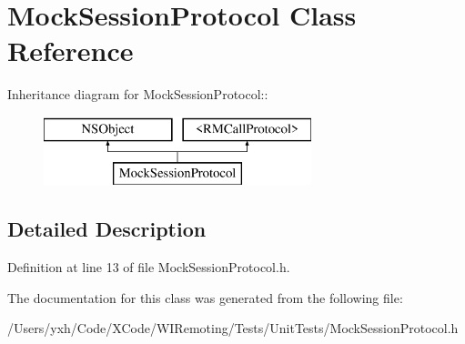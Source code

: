 \hypertarget{interface_mock_session_protocol}{
\section{MockSessionProtocol Class Reference}
\label{interface_mock_session_protocol}
}
Inheritance diagram for MockSessionProtocol::\begin{figure}[H]
\begin{center}
\leavevmode
\includegraphics[height=2cm]{interface_mock_session_protocol}
\end{center}
\end{figure}


\subsection{Detailed Description}


Definition at line 13 of file MockSessionProtocol.h.

The documentation for this class was generated from the following file:\begin{DoxyCompactItemize}
\item 
/Users/yxh/Code/XCode/WIRemoting/Tests/UnitTests/MockSessionProtocol.h\end{DoxyCompactItemize}
